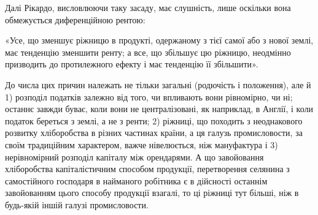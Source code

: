 Далі Рікардо, висловлюючи таку засаду, має слушність, лише оскільки вона
обмежується диференційною рентою:

«Усе, що зменшує ріжницю в продукті, одержаному з тієї самої або з
нової землі, має тенденцію зменшити ренту; а все, що збільшує цю ріжницю,
неодмінно призводить до протилежного ефекту і має тенденцію її збільшити».

До числа цих причин належать не тільки загальні (родючість і положення),
але й 1) розподіл податків залежно від того, чи впливають вони
рівномірно, чи ні; останнє завжди буває, коли вони не централізовані, як наприклад,
в Англії, і коли податок береться з землі, а не з ренти; 2) ріжниці,
що походить з неоднакового розвитку хліборобства в різних частинах країни,
а ця галузь промисловости, за своїм традиційним характером, важче нівелюється,
ніж мануфактура і 3) нерівномірний розподіл капіталу між орендарями.
А що завойовання хліборобства капіталістичним способом продукції, перетворення
селянина з самостійного господаря в найманого робітника є в дійсності останнім
завойованням цього способу продукції взагалі, то ці ріжниці тут більші,
ніж в будь-якій іншій галузі промисловости.
